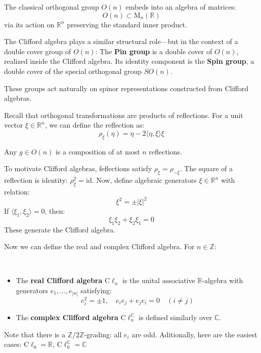 The classical orthogonal group $O(n)$ embeds into an algebra of matrices:
    \[
    O(n) \subset \mathrm{M}_n(\mathbb{R})
    \]
    via its action on $\mathbb{R}^n$ preserving the standard inner product.

The Clifford algebra plays a similar structural role—but in the context of a double cover group of $O(n)$: The \textbf{Pin group} is a double cover of $O(n)$, realized inside the Clifford algebra. Its identity component is the \textbf{Spin group}, a double cover of the special orthogonal group $SO(n)$.

These groups act naturally on spinor representations constructed from Clifford algebras.

Recall that orthogonal transformations are products of reflections. For a unit vector $\xi \in \mathbb{R}^n$, we can define the reflection as:
    \[
        \rho_\xi(\eta) = \eta - 2 \langle \eta, \xi \rangle \xi
    \]
\begin{theorem}
    Any $g \in O(n)$ is a composition of at most $n$ reflections.
\end{theorem}

To motivate Clifford algebras, feflections satisfy $\rho_\xi = \rho_{-\xi}$. The square of a reflection is identity: $\rho_\xi^2 = \mathrm{id}$. Now, define algebraic generators $\xi \in \mathbb{R}^n$ with relation:
    \[
        \xi^2 = \pm |\xi|^2
    \]
If $\langle \xi_1, \xi_2 \rangle = 0$, then:
    \[
        \xi_1 \xi_2 + \xi_2 \xi_1 = 0
    \]
These generate the Clifford algebra.

Now we can define the real and complex Clifford algebra. For $n \in \mathbb{Z}$:
\begin{definition}
\,
\begin{itemize}
    \item The \textbf{real Clifford algebra} $\mathrm{C}\ell_n$ is the unital associative $\mathbb{R}$-algebra with generators $e_1, \dots, e_{|n|}$ satisfying:
    \[
        e_i^2 = \pm 1, \quad e_i e_j + e_j e_i = 0 \quad (i \neq j)
    \]
    \item The \textbf{complex Clifford algebra} $\mathrm{C}\ell_n^{\mathbb{C}}$ is defined similarly over $\mathbb{C}$.
\end{itemize}
\end{definition}
Note that there is a $\mathbb{Z}/2\mathbb{Z}$-grading: all $e_i$ are odd. Aditionally, here are the easiest cases: $\mathrm{C}\ell_0 = \mathbb{R}$, $\mathrm{C}\ell_0^{\mathbb{C}} = \mathbb{C}$

